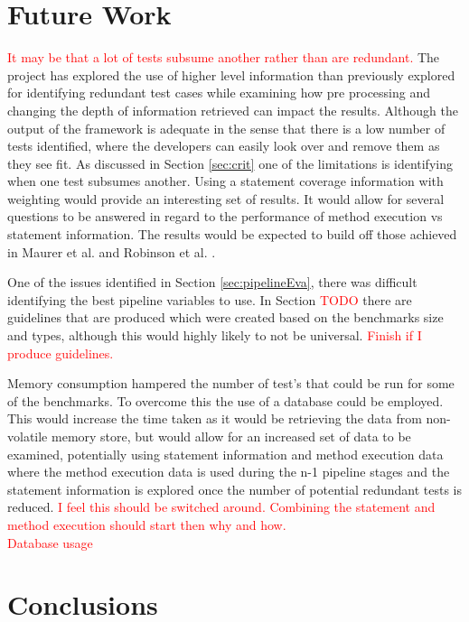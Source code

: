 \documentclass[11pt
              , a4paper
              , twoside
              , openright
              ]{report}
\newcommand\todo[1]{\textcolor{red}{#1}}
\begin{document}
\section{Future Work}
\todo{It may be that a lot of tests subsume another rather than are redundant.}
The project has explored the use of higher level information than previously explored for identifying redundant test cases while examining how pre processing and changing the depth of information retrieved can impact the results. Although the output of the framework is adequate in the sense that there is a low number of tests identified, where the developers can easily look over and remove them as they see fit. As discussed in Section \ref{sec:crit} one of the limitations is identifying when one test subsumes another. Using a statement coverage information with weighting would provide an interesting set of results. It would allow for several questions to be answered in regard to the performance of method execution vs statement information. The results would be expected to build off those achieved in Maurer et al. \cite{li2008static}  and Robinson et al. \cite{koochakzadeh2009test}. 

One of the issues identified in Section \ref{sec:pipelineEva}, there was difficult identifying the best pipeline variables to use. In Section \todo{TODO} there are guidelines that are produced which were created based on the benchmarks size and types, although this would highly likely to not be universal. \todo{Finish if I produce guidelines.}

Memory consumption hampered the number of test's that could be run for some of the benchmarks. To overcome this the use of a database could be employed. This would increase the time taken as it would be retrieving the data from non-volatile memory store, but would allow for an increased set of data to be examined, potentially using statement information and method execution data where the method execution data is used during the n-1 pipeline stages and the statement information is explored once the number of potential redundant tests is reduced. \todo{I feel this should be switched around. Combining the statement and method execution should start then why and how.}
\\
\todo{Database usage}\\


\section{Conclusions}
\end{document}
